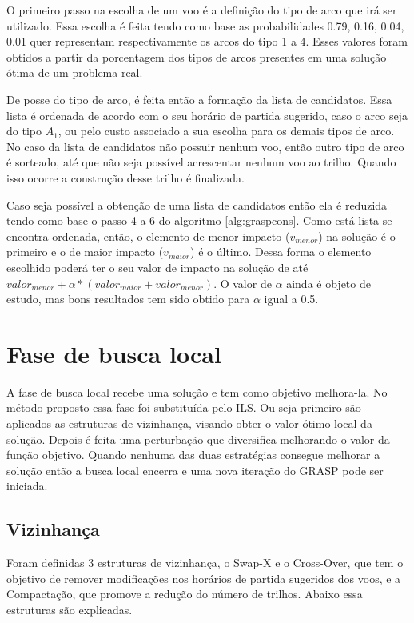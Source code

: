  O primeiro passo na escolha de um voo é a definição do tipo de arco que irá ser utilizado. Essa escolha é feita tendo como base as probabilidades 0.79, 0.16, 0.04, 0.01 quer representam respectivamente os arcos do tipo 1 a 4. Esses valores foram obtidos a partir da porcentagem dos tipos de arcos presentes em uma solução ótima de um problema real.
 
 De posse do tipo de arco, é feita então a formação da lista de candidatos. Essa lista é ordenada de acordo com o seu horário de partida sugerido, caso o arco seja do tipo $A_{1}$, ou pelo custo associado a sua escolha para os demais tipos de arco. No caso da lista de candidatos não possuir nenhum voo, então outro tipo de arco é sorteado, até que não seja possível acrescentar nenhum voo ao trilho. Quando isso ocorre a construção desse trilho é finalizada.
 
 Caso seja possível a obtenção de uma lista de candidatos então ela é reduzida tendo como base o passo 4 a 6 do algoritmo \ref{alg:graspcons}. Como está lista se encontra ordenada, então, o elemento de menor impacto ($v_{menor}$) na solução é o primeiro e o de maior impacto ($v_{maior}$) é o último. Dessa forma o elemento escolhido poderá ter o seu valor de impacto na solução de até $valor_{menor} + \alpha*(valor_{maior} + valor_{menor})$. O valor de $\alpha$ ainda é objeto de estudo, mas bons resultados tem sido obtido para $\alpha$ igual a 0.5.
 
 \section{Fase de busca local}
 
A fase de busca local recebe uma solução e tem como objetivo melhora-la. No
método proposto essa fase foi substituída pelo ILS. Ou seja primeiro são
aplicados as estruturas de vizinhança, visando obter o valor ótimo local da solução. Depois é feita uma perturbação que diversifica melhorando o valor da função objetivo. Quando nenhuma das duas estratégias consegue melhorar a solução então a busca local encerra e uma nova iteração do GRASP pode ser iniciada.
 
 \subsection{Vizinhança}
 
 Foram definidas 3 estruturas de vizinhança, o Swap-X e o Cross-Over, que tem o objetivo de remover modificações nos horários de partida sugeridos dos voos, e a Compactação, que promove a redução do número de trilhos. Abaixo essa estruturas são explicadas.
 
